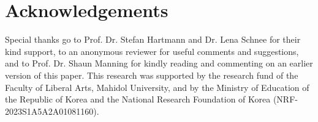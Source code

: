 \documentclass[output=paper,colorlinks,citecolor=brown]{langscibook}
\begin{document}
\section*{Acknowledgements}

\largerpage[1]

Special thanks go to Prof. Dr. Stefan Hartmann and Dr. Lena Schnee for their kind support, to an anonymous reviewer for useful comments and suggestions, and to Prof. Dr. Shaun Manning for kindly reading and commenting on an earlier version of this paper. This research was supported by the research fund of the Faculty of Liberal Arts, Mahidol University, and by the Ministry of Education of the Republic of Korea and the National Research Foundation of Korea (NRF-2023S1A5A2A01081160).

\sloppy
\printbibliography[heading=subbibliography,notkeyword=this]
\end{document}
